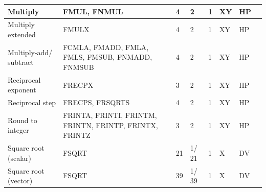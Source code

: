 \begin{longtable}{|p{1in}|p{1in}|l|l|l|p{1in}|l|p{1in}|}
\hline
Multiply & FMUL, FNMUL & 4 & 2 & 1 & XY & HP & \\
\hline
Multiply extended & FMULX & 4 & 2 & 1 & XY & HP & \\
\hline
Multiply-add/ subtract & FCMLA, FMADD, FMLA, FMLS, FMSUB, FNMADD, FNMSUB & 4 & 2 & 1 & XY & HP & \\
\hline
Reciprocal exponent & FRECPX & 3 & 2 & 1 & XY & HP & \\
\hline
Reciprocal step & FRECPS, FRSQRTS & 4 & 2 & 1 & XY & HP & \\
\hline
Round to integer & FRINTA, FRINTI, FRINTM, FRINTN, FRINTP, FRINTX, FRINTZ & 3 & 2 & 1 & XY & HP & \\
\hline
Square root (scalar) & FSQRT & 21 & 1/ 21 & 1 & X & DV & \\
\hline
Square root (vector) & FSQRT & 39 & 1/ 39 & 1 & X & DV & \\
\hline
\end{longtable}
